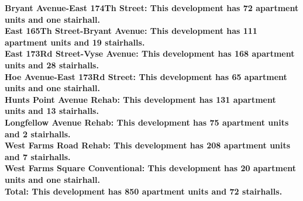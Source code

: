 \bf{Bryant Avenue-East 174Th Street}: This development has 72 apartment units and one stairhall.\\\bf{East 165Th Street-Bryant Avenue}: This development has 111 apartment units and 19 stairhalls.\\\bf{East 173Rd Street-Vyse Avenue}: This development has 168 apartment units and 28 stairhalls.\\\bf{Hoe Avenue-East 173Rd Street}: This development has 65 apartment units and one stairhall.\\\bf{Hunts Point Avenue Rehab}: This development has 131 apartment units and 13 stairhalls.\\\bf{Longfellow Avenue Rehab}: This development has 75 apartment units and 2 stairhalls.\\\bf{West Farms Road Rehab}: This development has 208 apartment units and 7 stairhalls.\\\bf{West Farms Square Conventional}: This development has 20 apartment units and one stairhall.\\\bf{Total}: This development has 850 apartment units and 72 stairhalls.\\